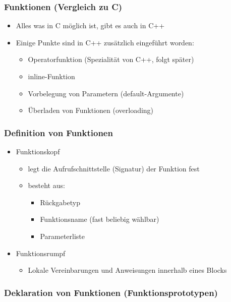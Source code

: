 \subsubsection{Funktionen (Vergleich zu C)\hfill}
\label{sec:Funktionen (Vergleich zu C)}
\begin{itemize}
	\item Alles was in C möglich ist, gibt es auch in C++
	\item Einige Punkte sind in C++ zusätzlich eingeführt worden:
	\begin{itemize}
		\item Operatorfunktion (Spezialität von C++, folgt später)
		\item inline-Funktion
		\item Vorbelegung von Parametern (default-Argumente)
		\item Überladen von Funktionen (overloading)
	\end{itemize}
\end{itemize}

\subsubsection{Definition von Funktionen\hfill}
\label{sec:Definition von Funktionen}
\begin{itemize}
	\item Funktionskopf
	\begin{itemize}
		\item legt die Aufrufschnittstelle (Signatur) der Funktion fest
		\item besteht aus:
		\begin{itemize}
			\item Rückgabetyp
			\item Funktionsname (fast beliebig wählbar)
			\item Parameterliste
		\end{itemize}
	\end{itemize}
	\item Funktionsrumpf
	\begin{itemize}
		\item Lokale Vereinbarungen und Anweisungen innerhalb eines Blocks
	\end{itemize}
\end{itemize}

\subsubsection{Deklaration von Funktionen (Funktionsprototypen) \hfill}
\label{sec:Deklaration von Funktionen}


